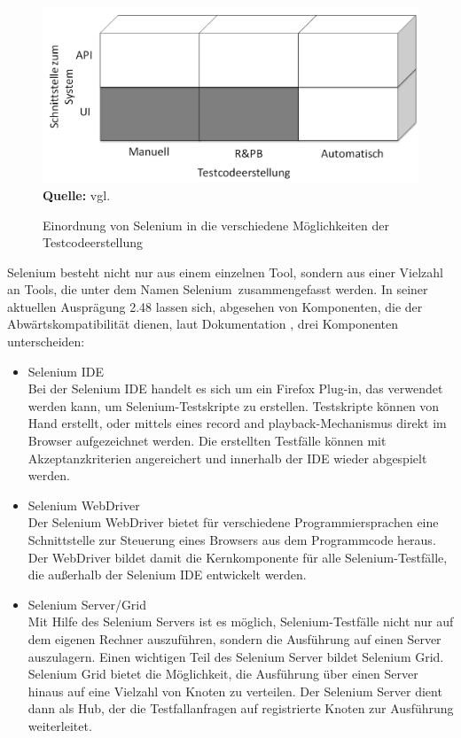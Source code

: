 \begin{figure}[htb]
  \centering  
  \includegraphics[scale=0.7]{img/bereicheTestcodeerstellungSelenium.png}\\
  \footnotesize\sffamily\textbf{Quelle:} vgl. \cite{meszaros_agile_2003}
  \caption{Einordnung von Selenium in die verschiedene Möglichkeiten der Testcodeerstellung}
  \label{fig:bereicheTestcodeerstellungSelenium}
\end{figure}

Selenium besteht nicht nur aus einem einzelnen Tool, sondern aus einer Vielzahl an Tools, die unter dem Namen \grq Selenium\grq\ zusammengefasst werden.
In seiner aktuellen Ausprägung 2.48 lassen sich, abgesehen von Komponenten, die der Abwärtskompatibilität dienen, laut Dokumentation \cite{selenium_selenium_2015-1}, drei Komponenten unterscheiden:

\begin{itemize}
\item Selenium IDE \\
Bei der Selenium IDE handelt es sich um ein Firefox Plug-in, das verwendet werden kann, um Selenium-Testskripte zu erstellen. Testskripte können von Hand erstellt, oder mittels eines \grq record and playback\grq -Mechanismus direkt im Browser aufgezeichnet werden. Die erstellten Testfälle können mit Akzeptanzkriterien angereichert und innerhalb der IDE wieder abgespielt werden.
\item Selenium WebDriver \\
Der Selenium WebDriver bietet für verschiedene Programmiersprachen eine Schnittstelle zur Steuerung eines Browsers aus dem Programmcode heraus. Der WebDriver bildet damit die Kernkomponente für alle Selenium-Testfälle, die außerhalb der Selenium IDE entwickelt werden.

\item Selenium Server/Grid \\
Mit Hilfe des Selenium Servers ist es möglich, Selenium-Testfälle nicht nur auf dem eigenen Rechner auszuführen, sondern die Ausführung auf einen Server auszulagern. Einen wichtigen Teil des Selenium Server bildet Selenium Grid. Selenium Grid bietet die Möglichkeit, die Ausführung über einen Server hinaus auf eine Vielzahl von Knoten zu verteilen. Der Selenium Server dient dann als Hub, der die Testfallanfragen auf registrierte Knoten zur Ausführung weiterleitet. 
\end{itemize}


